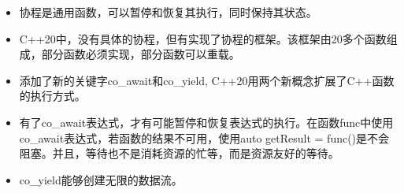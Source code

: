 \begin{tcolorbox}[breakable,enhanced jigsaw,colback=mygreen!5!white,colframe=mygreen!75!black,title={总结}]
	
\begin{itemize}
\item 
协程是通用函数，可以暂停和恢复其执行，同时保持其状态。

\item 
C++20中，没有具体的协程，但有实现了协程的框架。该框架由20多个函数组成，部分函数必须实现，部分函数可以重载。

\item 
添加了新的关键字co\_await和co\_yield, C++20用两个新概念扩展了C++函数的执行方式。

\item 
有了co\_await表达式，才有可能暂停和恢复表达式的执行。在函数func中使用co\_await表达式，若函数的结果不可用，使用auto getResult = func()是不会阻塞。并且，等待也不是消耗资源的忙等，而是资源友好的等待。

\item 
co\_yield能够创建无限的数据流。

\end{itemize}

\end{tcolorbox}

\newpage

























